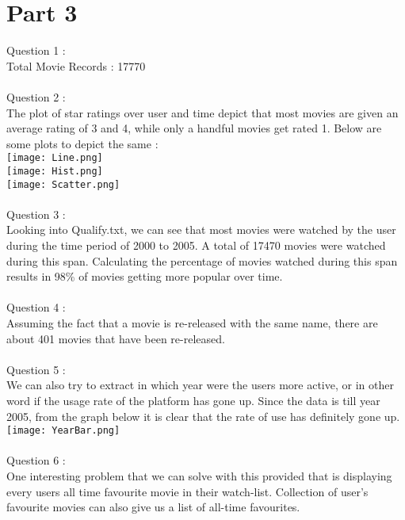 \documentclass{article}
\begin{document}
\section*{Part 3}
 Question 1 : \\
 Total Movie Records : 17770 \\
 \\
 Question 2 : \\
 The plot of star ratings over user and time depict that most movies are given an average rating of 3 and 4, while only a handful movies get rated 1.
 Below are some plots to depict the same : \\
 \texttt{[image: Line.png]} \\ 
 \texttt{[image: Hist.png]} \\
 \texttt{[image: Scatter.png]} \\ 
\\
 Question 3 : \\
 Looking into Qualify.txt, we can see that most movies were watched by the user during the time period of 2000 to 2005. A total of 17470 movies were watched during this span. Calculating the percentage of movies watched during this span results in 98\% of movies getting more popular over time.\\
\\
 Question 4 : \\
 Assuming the fact that a movie is re-released with the same name, there are about 401 movies that have been re-released.\\
\\
 Question 5 : \\
 We can also try to extract in which year were the users more active, or in other word if the usage rate of the platform has gone up. Since the data is till year 2005, from the graph below it is clear that the rate of use has definitely gone up. \\
 \texttt{[image: YearBar.png]} \\ 
 \\
 Question 6 : \\
 One interesting problem that we can solve with this provided that is displaying every users all time favourite movie in their watch-list. Collection of user's favourite movies can also give us a list of all-time favourites.\\
\end{document}
